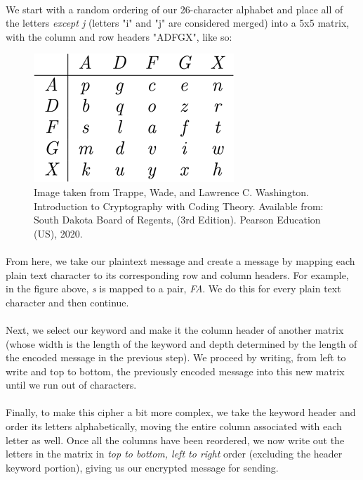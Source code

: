 \documentclass[12pt,a4paper]{article}
\begin{document}
\paragraph{}
We start with a random ordering of our 26-character alphabet and place all of 
the letters \textit{except j} (letters "i" and "j" are considered merged) into 
a 5x5 matrix, with the column and row headers "ADFGX", like so:

\begin{figure}[H]
\centering
\includegraphics{UNTABLE_02_001.png}
\caption{Image taken from Trappe, Wade, and Lawrence C. Washington. Introduction to Cryptography with Coding Theory. Available from: South Dakota Board of Regents, (3rd Edition). Pearson Education (US), 2020.}
\end{figure}

\paragraph{}
From here, we take our plaintext message and create a message by mapping each 
plain text character to its corresponding row and column headers.  For example, 
in the figure above, \textit{s} is mapped to a pair, \textit{FA}.  We do this 
for every plain text character and then continue.

\paragraph{}
Next, we select our keyword and make it the column header of another matrix 
(whose width is the length of the keyword and depth determined by the length 
of the encoded message in the previous step).  We proceed by writing, from left 
to write and top to bottom, the previously encoded message into this new 
matrix until we run out of characters.

\paragraph{}
Finally, to make this cipher a bit more complex, we take the keyword header and 
order its letters alphabetically, moving the entire column associated with each 
letter as well.  Once all the columns have been reordered, we now write out the 
letters in the matrix in \textit{top to bottom, left to right} order (excluding 
the header keyword portion), giving us our encrypted message for sending.
\end{document}
